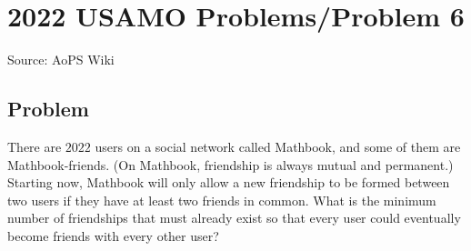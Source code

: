 \documentclass[12pt]{article}
\begin{document}
\section*{{2022 USAMO Problems/Problem 6}}
Source: AoPS Wiki

\subsection*{Problem}
There are $2022$ users on a social network called Mathbook, and some of them are Mathbook-friends. (On Mathbook, friendship is always mutual and permanent.) Starting now, Mathbook will only allow a new friendship to be formed between two users if they have at least two friends in common. What is the minimum number of friendships that must already exist so that every user could eventually become friends with every other user?
\end{document}
